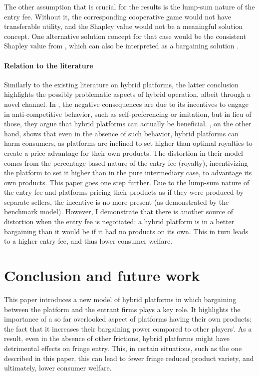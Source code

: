 \documentclass[a4paper]{article}
\begin{document}
The other assumption that is crucial for the results is the lump-sum nature of the entry fee.
Without it, the corresponding cooperative game would not have transferable utility, and the Shapley value would not be a meaningful solution concept.
One alternative solution concept for that case would be the consistent Shapley value from \textcite{maschler1992consistent}, which can also be interpreted as a bargaining solution \parencite{hart1996bargaining}.

\paragraph{Relation to the literature}
Similarly to the existing literature on hybrid platforms, the latter conclusion highlights the possibly problematic aspects of hybrid operation, albeit through a novel channel.
In \textcite{hagiu2022should}, the negative consequences are due to its incentives to engage in anti-competitive behavior, such as self-preferencing or imitation, but in lieu of those, they argue that hybrid platforms can actually be beneficial.
\textcite{anderson2021hybrid}, on the other hand, shows that even in the absence of such behavior, hybrid platforms can harm consumers, as platforms are inclined to set higher than optimal royalties to create a price advantage for their own products.
The distortion in their model comes from the percentage-based nature of the entry fee (royalty), incentivizing the platform to set it higher than in the pure intermediary case, to advantage its own products.
This paper goes one step further.
Due to the lump-sum nature of the entry fee and platforms pricing their products as if they were produced by separate sellers, the incentive is no more present (as demonstrated by the benchmark model).
However, I demonstrate that there is another source of distortion when the entry fee is negotiated: a hybrid platform is in a better bargaining than it would be if it had no products on its own.
This in turn leads to a higher entry fee, and thus lower consumer welfare.

\section{Conclusion and future work}
\label{sec:conclusion}

This paper introduces a new model of hybrid platforms in which bargaining between the platform and the entrant firms plays a key role.
It highlights the importance of a so far overlooked aspect of platforms having their own products: the fact that it increases their bargaining power compared to other players'.
As a result, even in the absence of other frictions, hybrid platforms might have detrimental effects on fringe entry.
This, in certain situations, such as the one described in this paper, this can lead to fewer fringe reduced product variety, and ultimately, lower consumer welfare.
\end{document}
